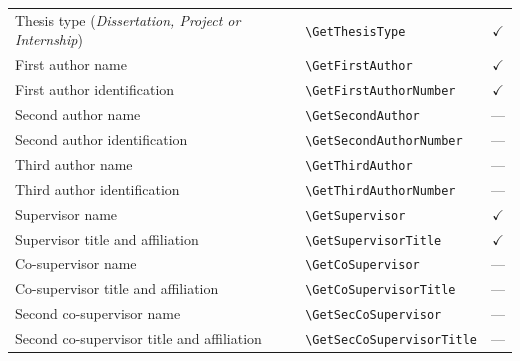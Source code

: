 \begin{longtable}[c]{llc}
    Thesis type (\scriptsize{\textit{Dissertation, Project or Internship}}) & \verb|\GetThesisType|           & \(\checkmark\)     \\

    First author name                                                       & \verb|\GetFirstAuthor|          & \(\checkmark\)     \\
    First author identification                                             & \verb|\GetFirstAuthorNumber|    & \(\checkmark\)     \\

    Second author name                                                      & \verb|\GetSecondAuthor|         & ---                \\
    Second author identification                                            & \verb|\GetSecondAuthorNumber|   & ---                \\

    Third author name                                                       & \verb|\GetThirdAuthor|          & ---                \\
    Third author identification                                             & \verb|\GetThirdAuthorNumber|    & ---                \\

    Supervisor name                                                         & \verb|\GetSupervisor|           & \(\checkmark\)     \\
    Supervisor title and affiliation                                        & \verb|\GetSupervisorTitle|      & \(\checkmark\)     \\

    Co-supervisor name                                                      & \verb|\GetCoSupervisor|         & ---                \\
    Co-supervisor title and affiliation                                     & \verb|\GetCoSupervisorTitle|    & ---                \\

    Second co-supervisor name                                               & \verb|\GetSecCoSupervisor|      & ---                \\
    Second co-supervisor title and affiliation                              & \verb|\GetSecCoSupervisorTitle| & ---                \\
\end{longtable}

